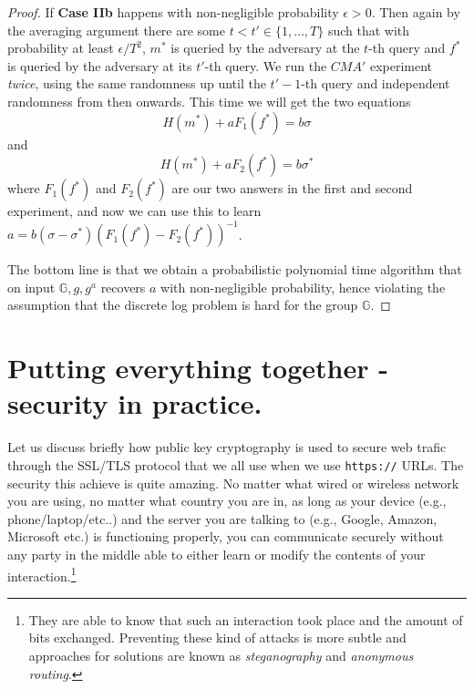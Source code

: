 \begin{proof}
If \textbf{Case IIb} happens with non-negligible probability
\(\epsilon>0\). Then again by the averaging argument there are some
\(t< t' \in \{1,\ldots,T\}\) such that with probability at least
\(\epsilon/T^2\), \(m^*\) is queried by the adversary at the \(t\)-th
query and \(f^*\) is queried by the adversary at its \(t'\)-th query. We
run the \(\ensuremath{\mathit{CMA}}'\) experiment \emph{twice}, using
the same randomness up until the \(t'-1\)-th query and independent
randomness from then onwards. This time we will get the two equations
\[H(m^*)+aF_1(f^*) = b\sigma\] and \[H(m^*)+aF_2(f^*)=b\sigma^*\] where
\(F_1(f^*)\) and \(F_2(f^*)\) are our two answers in the first and
second experiment, and now we can use this to learn
\(a= b(\sigma-\sigma^*)(F_1(f^*)-F_2(f^*))^{-1}\).

The bottom line is that we obtain a probabilistic polynomial time
algorithm that on input \(\mathbb{G},g,g^a\) recovers \(a\) with
non-negligible probability, hence violating the assumption that the
discrete log problem is hard for the group \(\mathbb{G}\).

\end{proof}

\hypertarget{nonromsec}{}

\section{Putting everything together - security in
practice.}\label{Putting-everything-together---}

Let us discuss briefly how public key cryptography is used to secure web
trafic through the SSL/TLS protocol that we all use when we use
\texttt{https://} URLs. The security this achieve is quite amazing. No
matter what wired or wireless network you are using, no matter what
country you are in, as long as your device (e.g., phone/laptop/etc..)
and the server you are talking to (e.g., Google, Amazon, Microsoft etc.)
is functioning properly, you can communicate securely without any party
in the middle able to either learn or modify the contents of your
interaction.\footnote{They are able to know that such an interaction
  took place and the amount of bits exchanged. Preventing these kind of
  attacks is more subtle and approaches for solutions are known as
  \emph{steganography} and \emph{anonymous routing}.}

